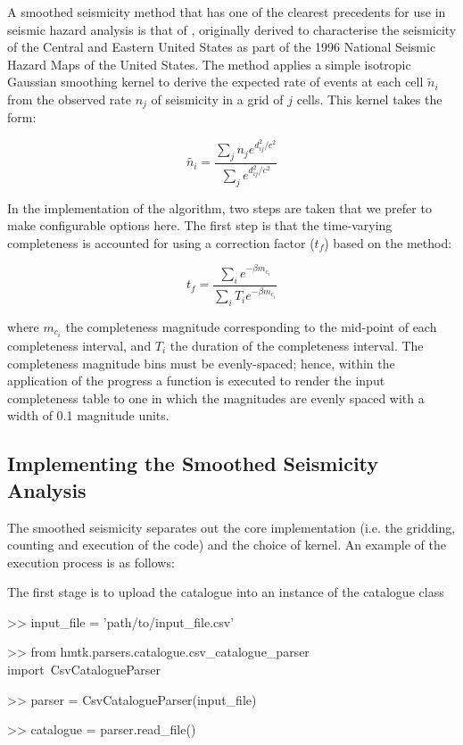 A smoothed seismicity method that has one of the clearest precedents for use in seismic hazard analysis is that of \cite{frankel1995}, originally derived to characterise the seismicity of the Central and Eastern United States as part of the 1996 National Seismic Hazard Maps of the United States. The method applies a simple isotropic Gaussian smoothing kernel to derive the expected rate of events at each cell $\tilde{n}_i$ from the observed rate $n_j$ of seismicity in a grid of $j$ cells. This kernel takes the form:

\begin{equation}
\tilde{n_i} = \frac{\sum_j n_j e^{d_{ij}^2 / c^2}}{\sum_j e^{d_{ij}^2 / c^2}} 
\end{equation}

In the implementation of the algorithm, two steps are taken that we prefer to make configurable options here. The first step is that the time-varying completeness is accounted for using a correction factor ($t_f$) based on the \cite{Weichert1980} method:

 \begin{equation}
 t_f = \frac{\sum_i e^{-\beta m_{c_i}}}{\sum_i T_i e^{-\beta m_{c_i}}} 
 \end{equation}
 
where $m_{c_i}$ the completeness magnitude corresponding to the mid-point of each completeness interval, and $T_i$ the duration of the completeness interval. The completeness magnitude bins must be evenly-spaced; hence, within the application of the progress a function is executed to render the input completeness table to one in which the magnitudes are evenly spaced with a width of 0.1 magnitude units. 

\subsection{Implementing the Smoothed Seismicity Analysis}

The smoothed seismicity separates out the core implementation (i.e. the gridding, counting and execution of the code) and the choice of kernel. An example of the execution process is as follows:

The first stage is to upload the catalogue into an instance of the catalogue class

\begin{python}[frame=single]
>> input_file = 'path/to/input_file.csv'

>> from hmtk.parsers.catalogue.csv_catalogue_parser import\
    CsvCatalogueParser

>> parser = CsvCatalogueParser(input_file)

>> catalogue = parser.read_file()
\end{python}

